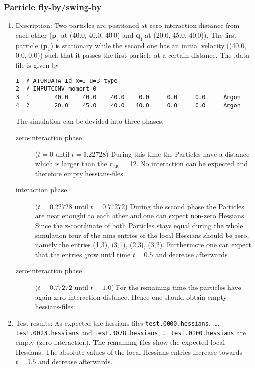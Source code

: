 \documentclass[a4paper]{article}
\newcommand{\boldp}{\boldsymbol{p}}
\newcommand{\boldq}{\boldsymbol{q}}
\begin{document}
\subsubsection{Particle fly-by/swing-by}
\label{sec-1-4-5}
\begin{enumerate}
\item Description:
\label{sec-1-4-5-1}
Two particles are positioned at zero-interaction distance from each other (\(\boldp_1\) at (40.0, 40.0, 40.0) and \(\boldq_1\) at (20.0, 45.0, 40.0)).
The first particle (\(\boldp_1\)) is stationary while the second one has an initial velocity ((40.0, 0.0, 0.0)) such that it passes the
first particle at a certain distance.
The .data file is given by
\begin{verbatim}
1  # ATOMDATA Id x=3 u=3 type
2  # INPUTCONV moment 0
3  1       40.0    40.0    40.0    0.0     0.0     0.0     Argon
4  2       20.0    45.0    40.0   40.0     0.0     0.0     Argon
\end{verbatim}
The simulation can be devided into three phases:
\begin{description}
\item[{zero-interaction phase}] (\(t = 0\) until \(t = 0.22728\)) During this time the Particles have a distance which is larger than the \(r_{\textrm{cut}}\) = 12.
No interaction can be expected and therefore empty hessians-files.
\item[{interaction phase}] (\(t = 0.22728\) until \(t = 0.77272\)) During the second phase the Particles are near enought to each other
and one can expect non-zero Hessians. Since the z-coordinate of both Particles stays equal during the whole simulation
four of the nine entries of the local Hessians should be zero, namely the entries (1,3), (3,1), (2,3), (3,2).
Furthermore one can expect that the entries grow until time \(t = 0.5\) and decrease afterwards.
\item[{zero-interaction phase}] (\(t = 0.77272\) until \(t = 1.0\)) For the remaining time the particles have again zero-interaction distance.
Hence one should obtain empty hessians-files.
\end{description}
\item Test results:
\label{sec-1-4-5-2}
As expected the hessians-files \texttt{test.0000.hessians}, \ldots{}, \texttt{test.0023.hessians} and \texttt{test.0078.hessians}, \ldots{}, \texttt{test.0100.hessians} are empty (zero-interaction).
The remaining files show the expected local Hessians. The absolute values of the local Hessians entries increase towards \(t=0.5\) and decrease afterwards.

\end{enumerate}
\end{document}
